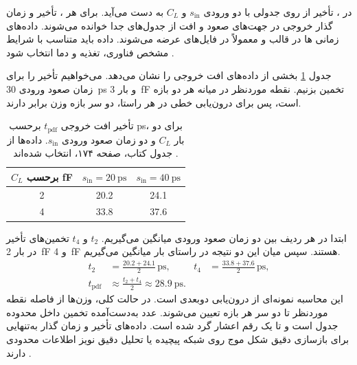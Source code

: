 در ، تأخیر از روی
جدولی با دو ورودی \(s_{\mathrm{in}}\) و \(C_L\) به دست
می‌آید. برای هر ، تأخیر و زمان گذار
خروجی در جهت‌های صعود و افت از جدول‌های جدا خوانده می‌شوند.
داده‌های زمانی ها در قالب 
و معمولاً در فایل‌های  عرضه می‌شوند. داده باید
متناسب با شرایط مشخص فناوری، تغذیه و دما انتخاب شود
\cite[بخش‌های  و ، صفحات
۱۷۳ و ۱۷۴]{weste}.

جدول \ref{tab:delay-nldm-interpolation} بخشی از داده‌های
افت خروجی  را نشان می‌دهد. می‌خواهیم تأخیر
را برای زمان صعود ورودی \qty{30}{\pico\second} و بار
\qty{3}{\femto\farad} تخمین بزنیم. نقطه موردنظر در
میانه هر دو بازه است، پس برای درون‌یابی خطی در هر راستا،
دو سر بازه وزن برابر دارند.

\begin{table}[htbp]
  \centering
  \caption{تأخیر افت خروجی \(t_{\mathrm{pdf}}\) برحسب
  \unit{\pico\second}، برای دو بار \(C_L\) و دو زمان صعود
  ورودی \(s_{\mathrm{in}}\).
  داده‌ها از جدول  کتاب، صفحه ۱۷۴، انتخاب شده‌اند
  \cite{weste}.}
  \label{tab:delay-nldm-interpolation}
  \begin{tabular}{ccc}
    \toprule
    \(C_L\) برحسب \unit{\femto\farad}
      & \(s_{\mathrm{in}}=\qty{20}{\pico\second}\)
      & \(s_{\mathrm{in}}=\qty{40}{\pico\second}\) \\
    \midrule
    \num{2} & \num{20.2} & \num{24.1} \\
    \num{4} & \num{33.8} & \num{37.6} \\
    \bottomrule
  \end{tabular}
\end{table}

ابتدا در هر ردیف بین دو زمان صعود ورودی میانگین می‌گیریم.
\(t_2\) و \(t_4\) تخمین‌های تأخیر در بار
\qty{2}{\femto\farad} و \qty{4}{\femto\farad} هستند.
سپس میان این دو نتیجه در راستای بار میانگین می‌گیریم.
\[
  \begin{aligned}
    t_2&=\frac{20.2+24.1}{2}\,\unit{\pico\second},&
    t_4&=\frac{33.8+37.6}{2}\,\unit{\pico\second},\\
    t_{\mathrm{pdf}}
      &\approx\frac{t_2+t_4}{2}
       \approx\qty{28.9}{\pico\second}.
  \end{aligned}
\]
این محاسبه نمونه‌ای از درون‌یابی دوبعدی است. در حالت کلی،
وزن‌ها از فاصله نقطه موردنظر تا دو سر هر بازه تعیین می‌شوند.
عدد به‌دست‌آمده تخمین داخل محدوده جدول است و تا یک رقم اعشار
گرد شده است. داده‌های تأخیر و زمان گذار به‌تنهایی برای بازسازی
دقیق شکل موج روی شبکه پیچیده  یا تحلیل دقیق نویز
اطلاعات محدودی دارند \cite[بخش ، صفحه ۱۷۴]{weste}.


